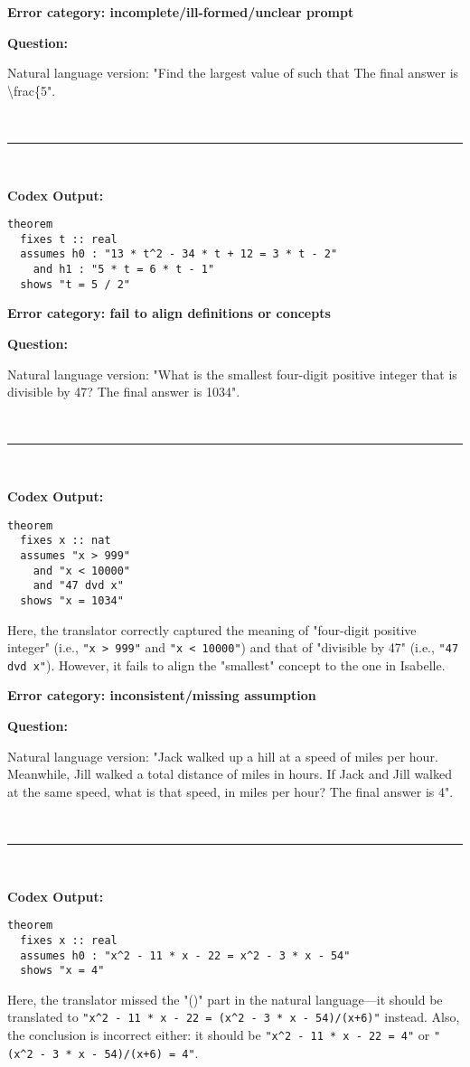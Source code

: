 \documentclass{article}
\begin{document}
\begin{boxB}
\textbf{Error category: incomplete/ill-formed/unclear prompt}

\textbf{Question:}

Natural language version: "Find the largest value of  
such that  The final answer is \textbackslash frac\{5".

\
\hrule
\

\textbf{Codex Output:}
\begin{lstlisting}
theorem
  fixes t :: real
  assumes h0 : "13 * t^2 - 34 * t + 12 = 3 * t - 2"
    and h1 : "5 * t = 6 * t - 1"
  shows "t = 5 / 2"  
\end{lstlisting}
\end{boxB}



\begin{boxB}
\textbf{Error category: fail to align definitions or concepts}

\textbf{Question:}

Natural language version: "What is the smallest four-digit positive integer that is divisible by 47? The final answer is 1034".

\
\hrule
\

\textbf{Codex Output:}
\begin{lstlisting}
theorem
  fixes x :: nat
  assumes "x > 999"
    and "x < 10000"
    and "47 dvd x"
  shows "x = 1034" 
\end{lstlisting}
\end{boxB}
Here, the translator correctly captured the meaning of "four-digit positive integer" (i.e., \texttt{"x > 999"} and \texttt{"x < 10000"}) and that of "divisible by 47" (i.e., \texttt{"47 dvd x"}). However, it fails to align the "smallest" concept to the one in Isabelle. 

\begin{boxB}
\textbf{Error category: inconsistent/missing assumption}

\textbf{Question:}

Natural language version: "Jack walked up a hill at a speed of  
miles per hour. Meanwhile, Jill walked a total distance of  miles 
in  hours. If Jack and Jill walked at the same speed, what is that speed, 
in miles per hour? The final answer is 4".

\
\hrule
\

\textbf{Codex Output:}
\begin{lstlisting}
theorem
  fixes x :: real
  assumes h0 : "x^2 - 11 * x - 22 = x^2 - 3 * x - 54"
  shows "x = 4"  
\end{lstlisting}
\end{boxB}
Here, the translator missed the "()" part in the natural language---it should be translated to \lstinline|"x^2 - 11 * x - 22 = (x^2 - 3 * x - 54)/(x+6)"| instead. Also, the conclusion is incorrect either: it should be \lstinline|"x^2 - 11 * x - 22 = 4"| or \lstinline|"(x^2 - 3 * x - 54)/(x+6) = 4"|. 
\end{document}
